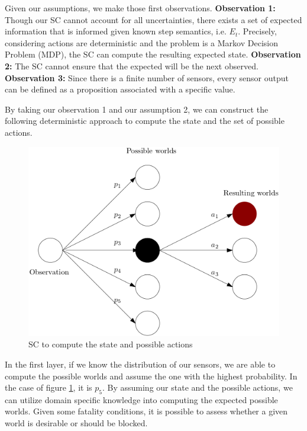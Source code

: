 \documentclass[a4paper,11pt]{article}
\begin{document}
\medskip 


Given our assumptions, we make those first observations. \newline
\textbf{Observation 1:} Though our SC cannot account for all uncertainties, there exists a set of expected information that is informed 
given known step semantics, i.e. $E_t$. Precisely, considering actions are deterministic and the problem is a Markov Decision Problem (MDP), the SC can compute the resulting expected state. \newline
\textbf{Observation 2:} The SC cannot ensure that the expected will be the next observed. \newline
\textbf{Observation 3:} Since there is a finite number of sensors, every sensor output can be defined as a proposition associated with a specific value. \newline 

\medskip 

By taking our observation 1 and our assumption 2, we can construct the following deterministic approach to compute the state and the set of possible actions. 


\begin{figure}[H]
  \centering
  \includegraphics[scale=0.55]{scworlds.png}
  \caption{SC to compute the state and possible actions}
  \label{fig:scworld}
\end{figure}

In the first layer, if we know the distribution of our sensors, we are able to compute the possible worlds and assume the one with the highest probability.
In the case of figure \ref{fig:scworld}, it is $p_5$. By assuming our state and the possible actions, we can utilize domain specific knowledge into 
computing the expected possible worlds. Given some fatality conditions, it is possible to assess whether a given world is desirable or should be blocked. 
\end{document}
